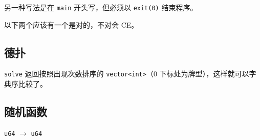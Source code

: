 \documentclass[12pt]{ctexart}
\begin{document}
另一种写法是在 \verb|main| 开头写，但必须以 \verb|exit(0)| 结束程序。

以下两个应该有一个是对的，不对会 CE。



\subsection{德扑}

\verb|solve| 返回按照出现次数排序的 \verb|vector<int>|（$0$ 下标处为牌型），这样就可以字典序比较了。



\subsection{随机函数}

\verb|u64| $\to$ \verb|u64|


\end{document}

